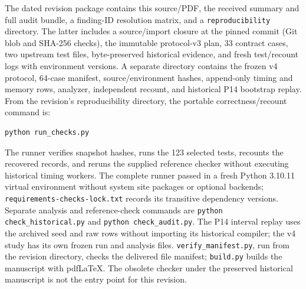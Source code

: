 \documentclass[10pt]{article}
\theoremstyle{plain}
\theoremstyle{definition}
\theoremstyle{remark}
\begin{document}
The dated revision package contains this source/PDF, the received summary and full audit bundle, a finding-ID resolution matrix, and a \texttt{reproducibility} directory. The latter includes a source/import closure at the pinned commit (Git blob and SHA-256 checks), the immutable protocol-v3 plan, 33 contract cases, two upstream test files, byte-preserved historical evidence, and fresh test/recount logs with environment versions. A separate  directory contains the frozen v4 protocol, 64-case manifest, source/environment hashes, append-only timing and memory rows, analyzer, independent recount, and historical P14 bootstrap replay. From the revision's reproducibility directory, the portable correctness/recount command is:
\begin{lstlisting}
python run_checks.py
\end{lstlisting}
The runner verifies snapshot hashes, runs the 123 selected tests, recounts the recovered records, and reruns the supplied reference checker without executing historical timing workers. The complete runner passed in a fresh Python 3.10.11 virtual environment without system site packages or optional backends; \texttt{requirements-checks-lock.txt} records its transitive dependency versions. Separate analysis and reference-check commands are \texttt{python check\_historical.py} and \texttt{python check\_audit.py}. The P14 interval replay uses the archived seed and raw rows without importing its historical compiler; the v4 study has its own frozen run and analysis files. \texttt{verify\_manifest.py}, run from the revision directory, checks the delivered file manifest; \texttt{build.py} builds the manuscript with pdfLaTeX. The obsolete checker under the preserved historical manuscript is not the entry point for this revision.
\end{document}
